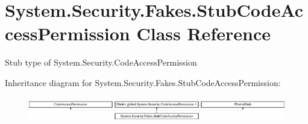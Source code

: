 \hypertarget{class_system_1_1_security_1_1_fakes_1_1_stub_code_access_permission}{\section{System.\-Security.\-Fakes.\-Stub\-Code\-Access\-Permission Class Reference}
\label{class_system_1_1_security_1_1_fakes_1_1_stub_code_access_permission}
}


Stub type of System.\-Security.\-Code\-Access\-Permission 


Inheritance diagram for System.\-Security.\-Fakes.\-Stub\-Code\-Access\-Permission\-:\begin{figure}[H]
\begin{center}
\leavevmode
\includegraphics[height=1.104536cm]{class_system_1_1_security_1_1_fakes_1_1_stub_code_access_permission}
\end{center}
\end{figure}
